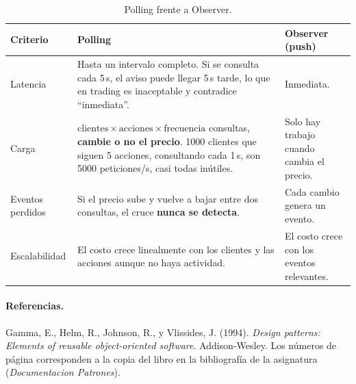 \begin{table}[H]
\centering
\small
\begin{tabularx}{\textwidth}{>{\raggedright\arraybackslash}p{2.4cm}
                             >{\raggedright\arraybackslash}X
                             >{\raggedright\arraybackslash}p{4cm}}
\toprule
\textbf{Criterio} & \textbf{Polling} & \textbf{Observer (push)} \\
\midrule
Latencia
  & Hasta un intervalo completo. Si se consulta cada 5\,s, el aviso puede llegar 5\,s tarde,
    lo que en trading es inaceptable y contradice ``inmediata''.
  & Inmediata. \\
\addlinespace
Carga
  & $\text{clientes} \times \text{acciones} \times \text{frecuencia}$ consultas,
    \textbf{cambie o no el precio}. 1000 clientes que siguen 5 acciones, consultando cada
    1\,s, son 5000 peticiones/s, casi todas inútiles.
  & Solo hay trabajo cuando cambia el precio. \\
\addlinespace
Eventos perdidos
  & Si el precio sube y vuelve a bajar entre dos consultas, el cruce \textbf{nunca se
    detecta}.
  & Cada cambio genera un evento. \\
\addlinespace
Escalabilidad
  & El costo crece linealmente con los clientes y las acciones aunque no haya actividad.
  & El costo crece con los eventos relevantes. \\
\bottomrule
\end{tabularx}
\caption{Polling frente a Observer.}
\end{table}

\paragraph{Referencias.}
Gamma, E., Helm, R., Johnson, R., y Vlissides, J. (1994). \emph{Design patterns: Elements of
reusable object-oriented software}. Addison-Wesley. Los números de página corresponden a la
copia del libro en la bibliografía de la asignatura (\emph{Documentacion Patrones}).
